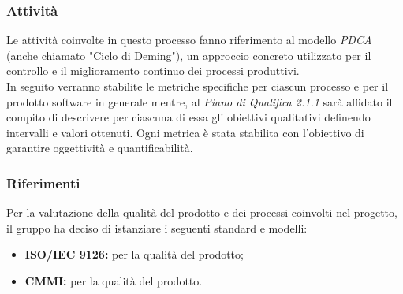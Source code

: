 \subsubsection{Attività}
Le attività coinvolte in questo processo fanno riferimento al modello \textit{PDCA\glo} (anche chiamato "Ciclo di Deming"), un approccio concreto utilizzato per il controllo e il miglioramento continuo dei processi produttivi.\\
In seguito verranno stabilite le metriche specifiche per ciascun processo e per il prodotto software in generale mentre, al \textit{Piano di Qualifica 2.1.1\doc} sarà affidato il compito di descrivere per ciascuna di essa gli obiettivi qualitativi definendo intervalli e valori ottenuti. Ogni metrica è stata stabilita con l'obiettivo di garantire oggettività e quantificabilità.



\subsubsection{Riferimenti}
Per la valutazione della qualità del prodotto e dei processi coinvolti nel progetto, il gruppo ha deciso di istanziare i seguenti standard e modelli:
\begin{itemize}
	\item \textbf{ISO/IEC 9126:} per la qualità del prodotto;
	\item \textbf{CMMI:} per la qualità del prodotto.
\end{itemize}
